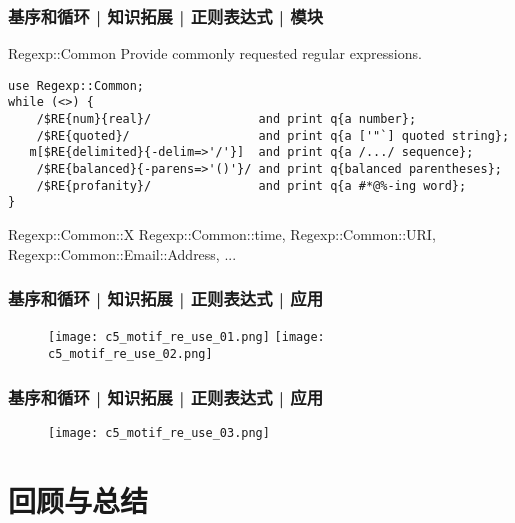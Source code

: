 \begin{frame}[fragile]
  \frametitle{基序和循环 | 知识拓展 | 正则表达式 | 模块}
  \begin{block}{Regexp::Common}
    Provide commonly requested regular expressions.
  \end{block}
  \vspace{-0.5em}
  \begin{lstlisting}[basicstyle=\scriptsize\tt]
use Regexp::Common;
while (<>) {
    /$RE{num}{real}/               and print q{a number};
    /$RE{quoted}/                  and print q{a ['"`] quoted string};
   m[$RE{delimited}{-delim=>'/'}]  and print q{a /.../ sequence};
    /$RE{balanced}{-parens=>'()'}/ and print q{balanced parentheses};
    /$RE{profanity}/               and print q{a #*@%-ing word};
}
\end{lstlisting}
  \vspace{-0.5em}
  \begin{block}{Regexp::Common::X}
    Regexp::Common::time, Regexp::Common::URI, Regexp::Common::Email::Address, ...
  \end{block}
\end{frame}

\begin{frame}
  \frametitle{基序和循环 | 知识拓展 | 正则表达式 | 应用}
  \begin{figure}
    \centering
    \texttt{[image: c5\_motif\_re\_use\_01.png]}\quad
    \texttt{[image: c5\_motif\_re\_use\_02.png]}
  \end{figure}
\end{frame}

\begin{frame}
  \frametitle{基序和循环 | 知识拓展 | 正则表达式 | 应用}
  \begin{figure}
    \centering
    \texttt{[image: c5\_motif\_re\_use\_03.png]}
  \end{figure}
\end{frame}

\section{回顾与总结}
